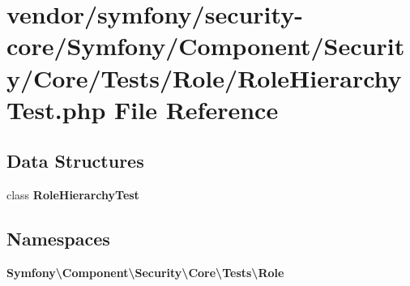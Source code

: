 \section{vendor/symfony/security-\/core/\+Symfony/\+Component/\+Security/\+Core/\+Tests/\+Role/\+Role\+Hierarchy\+Test.php File Reference}
\label{_role_hierarchy_test_8php}
\subsection*{Data Structures}
\begin{DoxyCompactItemize}
\item 
class {\bf Role\+Hierarchy\+Test}
\end{DoxyCompactItemize}
\subsection*{Namespaces}
\begin{DoxyCompactItemize}
\item 
 {\bf Symfony\textbackslash{}\+Component\textbackslash{}\+Security\textbackslash{}\+Core\textbackslash{}\+Tests\textbackslash{}\+Role}
\end{DoxyCompactItemize}
